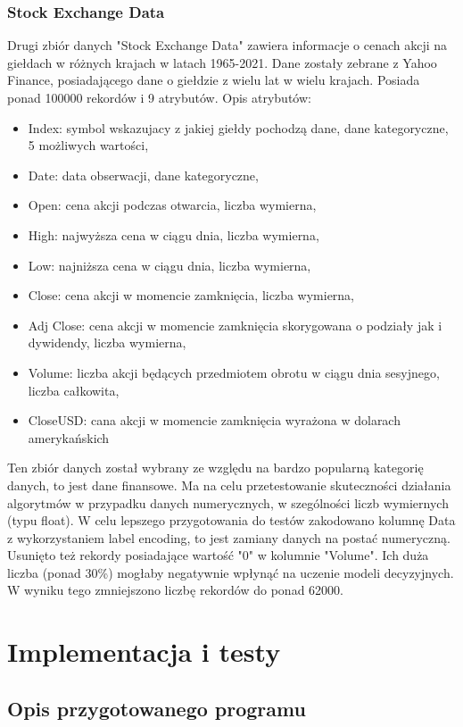 \documentclass[12pt,twoside]{article}
\begin{document}
\subsubsection{Stock Exchange Data}

Drugi zbiór danych "Stock Exchange Data" zawiera informacje o cenach akcji na giełdach w różnych krajach w latach 1965-2021.
Dane zostały zebrane z Yahoo Finance, posiadającego dane o giełdzie z wielu lat w wielu krajach.
Posiada ponad 100000 rekordów i 9 atrybutów. \cite{stock} Opis atrybutów:
\begin{itemize}[label=-,labelsep=0.4cm, leftmargin=1.25cm]
    \item Index: symbol wskazujacy z jakiej giełdy pochodzą dane, dane kategoryczne, 5 możliwych wartości,
    \item Date: data obserwacji, dane kategoryczne,
    \item Open: cena akcji podczas otwarcia, liczba wymierna,
    \item High: najwyższa cena w ciągu dnia, liczba wymierna,
    \item Low: najniższa cena w ciągu dnia, liczba wymierna,
    \item Close: cena akcji w momencie zamknięcia, liczba wymierna,
    \item Adj Close: cena akcji w momencie zamknięcia skorygowana o podziały jak i dywidendy, liczba wymierna,
    \item Volume: liczba akcji będących przedmiotem obrotu w ciągu dnia sesyjnego, liczba całkowita,
    \item CloseUSD: cana akcji w momencie zamknięcia wyrażona w dolarach amerykańskich
\end{itemize}
Ten zbiór danych został wybrany ze względu na bardzo popularną kategorię danych, to jest dane finansowe.
Ma na celu przetestowanie skuteczności działania algorytmów w przypadku danych numerycznych,
w szególności liczb wymiernych (typu float).
W celu lepszego przygotowania do testów zakodowano kolumnę Data z wykorzystaniem label encoding,
to jest zamiany danych na postać numeryczną.
Usunięto też rekordy posiadające wartość "0" w kolumnie "Volume".
Ich duża liczba (ponad 30\%) mogłaby negatywnie wpłynąć na uczenie modeli decyzyjnych.
W wyniku tego zmniejszono liczbę rekordów do ponad 62000.


\clearpage
\section{Implementacja i testy}
\subsection{Opis przygotowanego programu}
\end{document}
